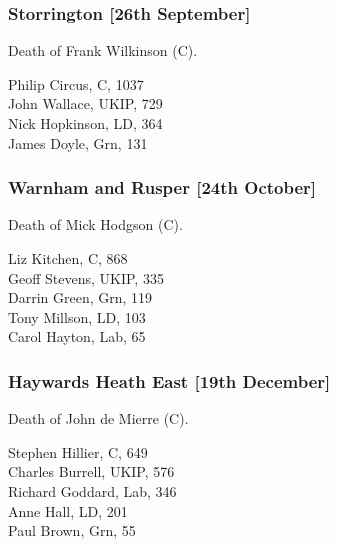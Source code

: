 \documentclass[a4paper,openany,10pt]{book}
\begin{document}
\subsubsection*{Storrington \hspace*{\fill}\nolinebreak[1]%
\enspace\hspace*{\fill}
[26th September]}


Death of Frank Wilkinson (C).



Philip Circus, C, 1037\\
John Wallace, UKIP, 729\\
Nick Hopkinson, LD, 364\\
James Doyle, Grn, 131\\


\subsubsection*{Warnham and Rusper \hspace*{\fill}\nolinebreak[1]%
\enspace\hspace*{\fill}
[24th October]}


Death of Mick Hodgson (C).



Liz Kitchen, C, 868\\
Geoff Stevens, UKIP, 335\\
Darrin Green, Grn, 119\\
Tony Millson, LD, 103\\
Carol Hayton, Lab, 65\\


\subsubsection*{Haywards Heath East \hspace*{\fill}\nolinebreak[1]%
\enspace\hspace*{\fill}
[19th December]}


Death of John de Mierre (C).



Stephen Hillier, C, 649\\
Charles Burrell, UKIP, 576\\
Richard Goddard, Lab, 346\\
Anne Hall, LD, 201\\
Paul Brown, Grn, 55\\
\end{document}
